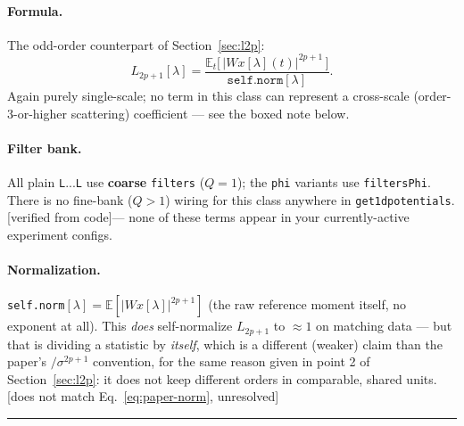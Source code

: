 \documentclass[11pt]{article}
\newcommand{\E}{\mathbb{E}}
\newcommand{\Wx}{W\!x}
\newcommand{\code}[1]{\texttt{#1}}
\renewcommand{\_}{\origunderscore\allowbreak} %
\newcommand{\verified}{\textcolor{blue!50!black}{[verified from code]}}
\newcommand{\suspect}{\textcolor{red!60!black}{[does not match Eq.~\ref{eq:paper-norm}, unresolved]}}
\begin{document}
\paragraph{Formula.} The odd-order counterpart of Section~\ref{sec:l2p}:
\begin{equation}
  L_{2p+1}[\lambda] = \frac{\E_t\big[\,|\Wx[\lambda](t)|^{2p+1}\,\big]}{\code{self.norm}[\lambda]}.
\end{equation}
Again purely single-scale; no term in this class can represent a cross-scale
(order-3-or-higher scattering) coefficient — see the boxed note below.

\paragraph{Filter bank.} All plain \code{L\_1}...\code{L\_7} use \textbf{coarse}
\code{filters} ($Q=1$); the \code{\_phi} variants use \code{filters\_Phi}. There
is no fine-bank ($Q{>}1$) wiring for this class anywhere in
\code{get\_1d\_potentials}. \verified — none of these terms appear in your
currently-active experiment configs.

\paragraph{Normalization.} \code{self.norm}$[\lambda] = \E[|\Wx[\lambda]|^{2p+1}]$
(the raw reference moment itself, no exponent at all). This \emph{does}
self-normalize $L_{2p+1}$ to $\approx 1$ on matching data — but that is dividing
a statistic by \emph{itself}, which is a different (weaker) claim than the
paper's $/\sigma^{2p+1}$ convention, for the same reason given in point 2 of
Section~\ref{sec:l2p}: it does not keep different orders in comparable, shared
units. \suspect

\bigskip
\hrule
\bigskip
\end{document}
